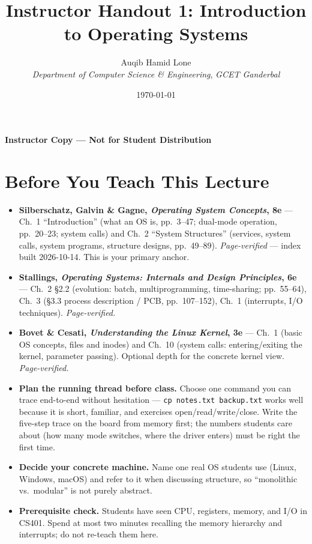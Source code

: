 \documentclass[11pt]{article}
\title{Instructor Handout 1: Introduction to Operating Systems}
\author{Auqib Hamid Lone\\[0.3em]
  \emph{Department of Computer Science \& Engineering}, \emph{GCET Ganderbal}}
\date{\today}
\begin{document}
\maketitle
{\centering\large\color{negative}\textbf{Instructor Copy --- Not for Student Distribution}\par}
\vspace{0.5cm}

\section{Before You Teach This Lecture}

\begin{itemize}
  \item \textbf{Silberschatz, Galvin \& Gagne, \textit{Operating System Concepts}, 8e} --- Ch.~1 ``Introduction'' (what an OS is, pp.~3--47; dual-mode operation, pp.~20--23; system calls) and Ch.~2 ``System Structures'' (services, system calls, system programs, structure designs, pp.~49--89). \emph{Page-verified} --- index built 2026-10-14. This is your primary anchor.
  \item \textbf{Stallings, \textit{Operating Systems: Internals and Design Principles}, 6e} --- Ch.~2 §2.2 (evolution: batch, multiprogramming, time-sharing; pp.~55--64), Ch.~3 (\S3.3 process description / PCB, pp.~107--152), Ch.~1 (interrupts, I/O techniques). \emph{Page-verified.}
  \item \textbf{Bovet \& Cesati, \textit{Understanding the Linux Kernel}, 3e} --- Ch.~1 (basic OS concepts, files and inodes) and Ch.~10 (system calls: entering/exiting the kernel, parameter passing). Optional depth for the concrete kernel view. \emph{Page-verified.}
  \item \textbf{Plan the running thread before class.} Choose one command you can trace end-to-end without hesitation --- \texttt{cp notes.txt backup.txt} works well because it is short, familiar, and exercises open/read/write/close. Write the five-step trace on the board from memory first; the numbers students care about (how many mode switches, where the driver enters) must be right the first time.
  \item \textbf{Decide your concrete machine.} Name one real OS students use (Linux, Windows, macOS) and refer to it when discussing structure, so ``monolithic vs.\ modular'' is not purely abstract.
  \item \textbf{Prerequisite check.} Students have seen CPU, registers, memory, and I/O in CS401. Spend at most two minutes recalling the memory hierarchy and interrupts; do not re-teach them here.
\end{itemize}
\end{document}
